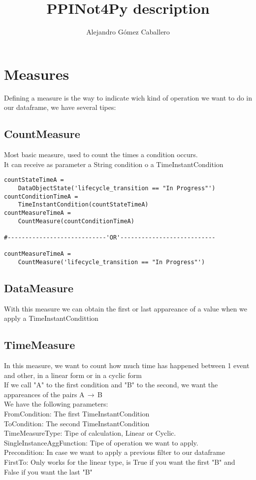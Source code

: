 \documentclass[11pt]{article} %
\title{PPINot4Py description}
\author{Alejandro Gómez Caballero}
\begin{document}
\maketitle

\section{Measures}

Defining a measure is the way to indicate wich kind of operation we want to do in our dataframe, we have several tipes:


\subsection{CountMeasure}
Most basic measure, used to count the times a condition occurs.\\
It can receive as parameter a String condition o a TimeInstantCondition

\begin{lstlisting}[style = Python]
countStateTimeA = 
    DataObjectState('lifecycle_transition == "In Progress"')
countConditionTimeA = 
    TimeInstantCondition(countStateTimeA)
countMeasureTimeA = 
    CountMeasure(countConditionTimeA)

#----------------------------'OR'---------------------------

countMeasureTimeA = 
    CountMeasure('lifecycle_transition == "In Progress"')    

\end{lstlisting}

\subsection{DataMeasure}
With this measure we can obtain the first or last appareance of a value when we apply a TimeInstantCondittion

\subsection{TimeMeasure}

In this measure, we want to count how much time has happened between 1 event and other, in a linear form or in a cyclic form\\

If we call "A" to the first condition and "B" to the second, we want the appareances of the pairs A$\,\to\,$B\\
We have the following parameters:\\
\indent
FromCondition: The first TimeInstantCondition \\
\indent
ToCondition: The second TimeInstantCondition \\
\indent
TimeMeasureType: Tipe of calculation, Linear or Cyclic.\\
\indent
SingleInstanceAggFunction: Tipe of operation we want to apply.\\
\indent
Precondition: In case we want to apply a previous filter to our dataframe\\ 
\indent
FirstTo: Only works for the linear type, is True if you want the first "B" and False if you want the last "B"\\
\end{document}
